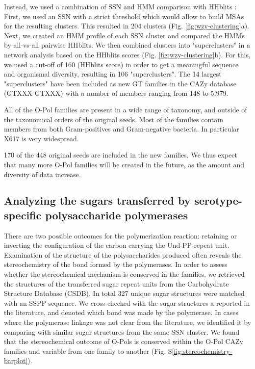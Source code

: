 \documentclass{article}
\begin{document}
Instead, we used a combination of SSN and HMM comparison with HHblits \cite{remmert_hhblits_2012}: First, we used an SSN with a strict threshold which would allow to build MSAs for the resulting clusters. This resulted in 204 clusters (Fig. \ref{fig:wzy-clustering}a). Next, we created an HMM profile of each SSN cluster and compared the HMMs by all-vs-all pairwise HHblits. We then combined clusters into "superclusters" in a network analysis based on the HHblits scores (Fig. \ref{fig:wzy-clustering}b). For this, we used a cut-off of 160 (HHblits score) in order to get a meaningful sequence and organismal diversity, resulting in 106 "superclusters". The 14 largest "superclusters" have been included as new GT families in the CAZy database (GTXXX-GTXXX) with a number of members ranging from 148 to 5,979.

All of the O-Pol families are present in a wide range of taxonomy, and outside of the taxonomical orders of the original seeds. Most of the families contain members from both Gram-positives and Gram-negative bacteria. In particular X617 is very widespread.

170 of the 448 original seeds are included in the new families. We thus expect that many more O-Pol families will be created in the future, as the amount and diversity of data increase.

\subsection{Analyzing the sugars transferred by serotype-specific polysaccharide polymerases}

There are two possible outcomes for the polymerization reaction: retaining or inverting the configuration of the carbon carrying the Und-PP-repeat unit. Examination of the structure of the polysaccharides produced often reveals the stereochemistry of the bond formed by the polymerases. In order to assess whether the stereochemical mechanism is conserved in the families, we retrieved the structures of the transferred sugar repeat units from the Carbohydrate Structure Database (CSDB)\cite{toukach_carbohydrate_2016}. In total 327 unique sugar structures were matched with an SSPP sequence. We cross-checked with the sugar structures a reported in the literature, and denoted which bond was made by the polymerase. In cases where the polymerase linkage was not clear from the literature, we identified it by comparing with similar sugar structures from the same SSN cluster. We found that the stereochemical outcome of O-Pols is conserved within the O-Pol CAZy families and variable from one family to another (Fig. S\ref{fig:stereochemistry-barplot}).
\end{document}
